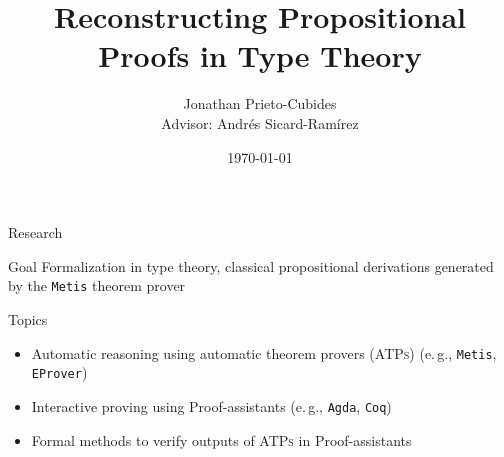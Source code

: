 \documentclass[10pt, xetex, hyperref={pdfpagelabels=false}]{beamer}
\title[Reconstructing Propositional Proofs in Type Theory]
  {\textbf{Reconstructing Propositional Proofs in Type Theory}}
\date{\today}
\author[Jonathan Prieto-Cubides]{Jonathan Prieto-Cubides\\
Advisor: Andr\'es Sicard-Ram\'irez
}
\institute{
Master in Applied Mathematics\\
Universidad EAFIT\\
Medell\'in, Colombia}
\newcommand{\abbre}[1]{\textsc{#1}\xspace}
\newcommand{\ATPs}{\abbre{ATPs}}
\newcommand{\name}[1]{\texttt{#1}\xspace}
\newcommand{\prg}[1]{\texttt{#1}\xspace}
\newcommand{\Agda}{\prg{Agda}}
\newcommand{\Metis}{\prg{Metis}}
\newcommand{\abbrev}[1]{#1} %
\newcommand{\eg}{\abbrev{e.\,g.}}
\begin{document}
\setcounter{page}{1}


\begin{frame}[plain]
\titlepage
\end{frame}


\begin{frame}{Research}

\begin{block}{Goal}
Formalization in type theory, classical propositional
derivations generated by the \Metis theorem prover
\end{block}
\pause
\begin{block}{Topics}
\begin{itemize}
\item Automatic reasoning using automatic theorem provers (\ATPs) (\eg, \Metis, \name{EProver})
\item Interactive proving using Proof-assistants (\eg, \Agda, \name{Coq})
\item Formal methods to verify outputs of \ATPs in Proof-assistants
\end{itemize}
\end{block}
\end{frame}
\end{document}
